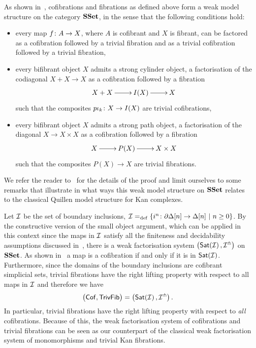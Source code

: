 \documentclass[reqno,10pt,a4paper,oneside,draft]{amsart}
\begin{document}
\bigskip

As shown in~\cite[Corollary~5.3.2]{henry2018wms}, cofibrations and fibrations as defined above form  a weak model structure on the category $\SSet$, in the sense that the following conditions hold:
\begin{itemize}
\item every map $f \co A \to X$, where $A$ is cofibrant and $X$ is fibrant, can be factored as a
cofibration followed by a trivial fibration  and as a trivial cofibration followed by a trivial fibration,
\item every bifibrant object $X$ admits a strong cylinder object, \ie  a factorisation of the codiagonal $ X + X \to X$ as a cofibration followed by a fibration 
\[
\xymatrix{X + X \ar[r] &  I(X) \ar[r] & X }
\]
such that the composites $p  \iota_k \co X \to I(X)$ are trivial cofibrations,
\item every bifibrant object $X$ admits a strong path object, \ie a factorisation of the diagonal 
$X \to X \times X$ as a cofibration followed by a fibration
\[
\xymatrix{X  \ar[r]  & P(X) \ar[r] & X \times X  }
 \]
 such that the composites $P(X) \to X$ are trivial fibrations.
\end{itemize}


\medskip

We refer the reader to~\cite{henry2018wms} for the details of the proof and limit ourselves to some remarks that illustrate in what ways this weak model structure on $\SSet$ relates to the classical Quillen model structure for Kan complexes. 


\begin{remark} Let $\cal{I}$ be the set of boundary inclusions, \ie $\cal{I} \defeq \{ i^n \co  \partial \Delta[n] \to \Delta[n] \ | \ n \geq 0 \}$.  By the constructive version of the small object argument, which can be applied in this context since the 
maps in $\cal{I}$ satisfy all the finiteness and decidability assumptions discussed  in~\cite[\S 4.1.4]{henry2018wms}, there is a weak factorisation system $\big( \mathsf{Sat}(\cal{I}) \, , \cal{I}^\pitchfork \big)$
on $\SSet$. As shown in~\cite[Proposition 5.1.7]{henry2018wms} a map is a cofibration if and only if it is in $\mathsf{Sat}(\cal{I})$. Furthermore, since the domains of the boundary inclusions are cofibrant simplicial sets, trivial fibrations have the right lifting property with respect to all maps in $\cal{I}$ and therefore we have
\[
\big( \Cof, \TrivFib \big) = \big( \mathsf{Sat}(\cal{I}) \, , \cal{I}^\pitchfork \big) \, .
\]
In particular, trivial fibrations have the right lifting property with respect to \emph{all} cofibrations. Because of this, the weak factorisation system of cofibrations and trivial fibrations can be seen as our counterpart of the classical weak factorisation system of monomorphisms and trivial Kan fibrations.
\end{remark} 
\end{document}
